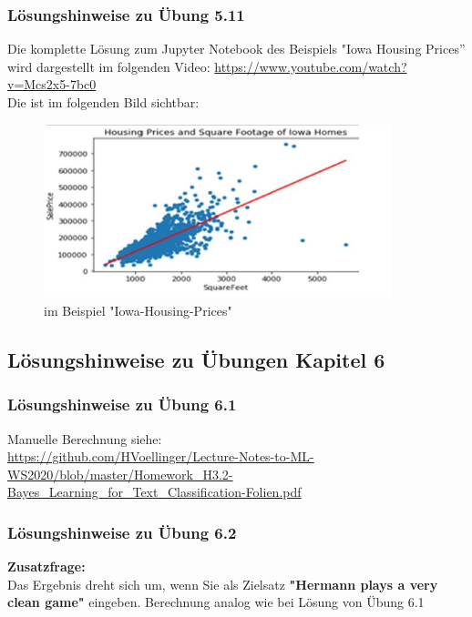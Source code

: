 \documentclass[12pt]{article}
\begin{document}
\subsubsection{Lösungshinweise zu Übung 5.11}
%
Die komplette Lösung zum Jupyter Notebook des Beispiels "Iowa Housing Prices” wird dargestellt im folgenden Video: \url{https://www.youtube.com/watch?v=Mcs2x5-7bc0}\\ 
Die {\color{red}{sLR-Gerade}} ist im folgenden Bild sichtbar: 
\begin{figure}[ht]
  \centering
  \hspace*{-0.1cm} 
  \includegraphics[width=0.9\textwidth]{Iowa-Housing-Prices}
  \caption{{\color{red}{sLR-Gerade}} im Beispiel "Iowa-Housing-Prices"}     
  \label{fig:Iowa-HP}
\end{figure}

\newpage

\subsection{Lösungshinweise zu Übungen Kapitel 6}

\subsubsection{Lösungshinweise zu Übung 6.1}

Manuelle Berechnung siehe:\\
\url{https://github.com/HVoellinger/Lecture-Notes-to-ML-WS2020/blob/master/Homework_H3.2-Bayes_Learning_for_Text_Classification-Folien.pdf}\\

\subsubsection{Lösungshinweise zu Übung 6.2}

\textbf{Zusatzfrage:} \\
Das Ergebnis dreht sich um, wenn Sie als Zielsatz \textbf{"Hermann plays a very clean game"} eingeben. Berechnung analog wie bei Lösung von Übung 6.1\\
\end{document}
